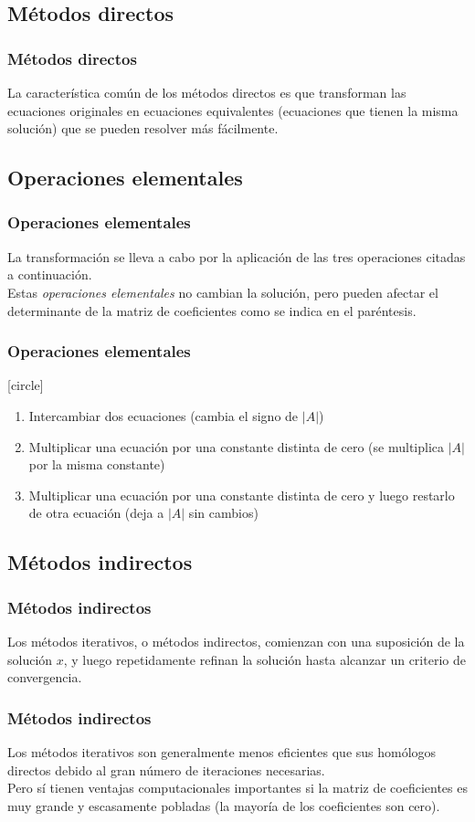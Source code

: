 \subsection{Métodos directos}
\begin{frame}
\frametitle{Métodos directos}
La característica común de los métodos directos es que transforman las ecuaciones originales en ecuaciones equivalentes (ecuaciones que tienen la misma solución) que se pueden resolver más fácilmente.
\end{frame}
\subsection*{Operaciones elementales}
\begin{frame}
\frametitle{Operaciones elementales}
La transformación se lleva a cabo por la aplicación de las tres operaciones citadas a continuación. 
\\
\bigskip
Estas \emph{operaciones elementales} no cambian la solución, pero pueden afectar el determinante de la matriz de coeficientes como se indica en el paréntesis.
\end{frame}
\begin{frame}
\frametitle{Operaciones elementales}
[circle]
\begin{enumerate}[<+->]
\item Intercambiar dos ecuaciones (cambia el signo de $\vert A \vert$)
\item Multiplicar una ecuación por una constante distinta de cero (se multiplica $\vert A \vert$ por la misma constante)
\item Multiplicar una ecuación por una constante distinta de cero y luego restarlo de otra ecuación (deja a $\vert A \vert$ sin cambios)
\end{enumerate}
\end{frame}
\subsection{Métodos indirectos}
\begin{frame}
\frametitle{Métodos indirectos}
Los métodos iterativos, o métodos indirectos, comienzan con una suposición de la solución $x$, y luego repetidamente refinan la solución hasta alcanzar un criterio de convergencia.
\end{frame}
\begin{frame}
\frametitle{Métodos indirectos}
Los métodos iterativos son generalmente menos eficientes que sus homólogos directos debido al gran número de iteraciones necesarias.
\\
\bigskip
Pero sí tienen ventajas computacionales importantes si la matriz de coeficientes es muy grande y escasamente pobladas (la mayoría de los coeficientes son cero).
\end{frame}
